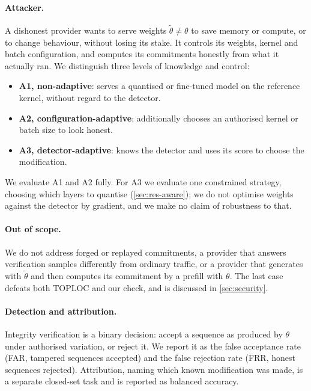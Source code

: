 \documentclass[10pt,twocolumn]{article}
\begin{document}
\paragraph{Attacker.}
A dishonest provider wants to serve weights $\tilde\theta \neq \theta$ to save memory or compute, or to change behaviour, without losing its stake.
It controls its weights, kernel and batch configuration, and computes its commitments honestly from what it actually ran.
We distinguish three levels of knowledge and control:
\begin{itemize}
  \item \textbf{A1, non-adaptive}: serves a quantised or fine-tuned model on the reference kernel, without regard to the detector.
  \item \textbf{A2, configuration-adaptive}: additionally chooses an authorised kernel or batch size to look honest.
  \item \textbf{A3, detector-adaptive}: knows the detector and uses its score to choose the modification.
\end{itemize}
We evaluate A1 and A2 fully. For A3 we evaluate one constrained strategy, choosing which layers to quantise (\cref{sec:res-aware}); we do not optimise weights against the detector by gradient, and we make no claim of robustness to that.

\paragraph{Out of scope.}
We do not address forged or replayed commitments, a provider that answers verification samples differently from ordinary traffic, or a provider that generates with $\tilde\theta$ and then computes its commitment by a prefill with $\theta$.
The last case defeats both TOPLOC and our check, and is discussed in \cref{sec:security}.

\paragraph{Detection and attribution.}
Integrity verification is a binary decision: accept a sequence as produced by $\theta$ under authorised variation, or reject it.
We report it as the false acceptance rate (FAR, tampered sequences accepted) and the false rejection rate (FRR, honest sequences rejected).
Attribution, naming which known modification was made, is a separate closed-set task and is reported as balanced accuracy.

\end{document}
